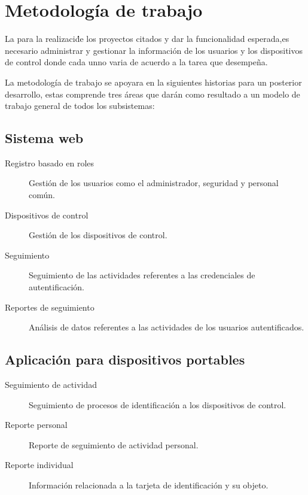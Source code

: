\documentclass[11pt,twocolumn]{article}
\begin{document}
\section{Metodolog\'ia de trabajo}  

La para la realizaci\' de los proyectos citados y dar la funcionalidad 
esperada,es necesario  administrar y gestionar la informaci\'on de los usuarios y los 
dispositivos de control donde cada unno varia de acuerdo a la tarea que desempe\~na.

La metodolog\'ia de trabajo se apoyara en la siguientes historias para un posterior 
desarrollo, estas  comprende tres \'areas  que dar\'an como resultado a un 
modelo de trabajo general de todos los subsistemas:\\

	\subsection{ Sistema web }
	
	\begin{description}
		\item [Registro basado en roles] Gesti\'on de los usuarios como el 
		administrador, seguridad y personal com\'un.
		\item [Dispositivos de control] Gesti\'on de los dispositivos de control.
		\item [Seguimiento] Seguimiento de las actividades referentes a las 
		credenciales de autentificaci\'on.
		\item [Reportes de seguimiento] An\'alisis de datos referentes a las 
		actividades de los usuarios autentificados.
	\end{description}
	
	\subsection{Aplicaci\'on para dispositivos portables}		
	
	 \begin{description}
		 \item[Seguimiento de actividad] Seguimiento de procesos de identificaci\'on 
		 a los dispositivos de control.
		 \item[Reporte personal] Reporte de seguimiento de actividad personal.
		 \item[Reporte individual] Informaci\'on relacionada a la tarjeta de identificaci\'on y su objeto.
	 \end{description}
	
\end{document}
